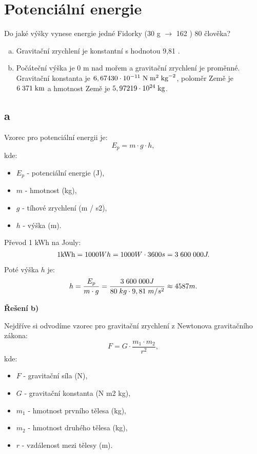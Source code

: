 \documentclass{article}
\begin{document}
\maketitle
\tableofcontents
\newpage



\section{Potenciální energie \spicy}
Do jaké výšky vynese energie jedné Fidorky (30 g $\rightarrow$ 162 \ueqKCAL) 80 \ueqKG \fs člověka?


\begin{enumerate}[a)]
    \item Gravitační zrychlení je konstantní s hodnotou 9,81 \ueqMandSinvsq.
    \item Počáteční výška je 0 m nad mořem a gravitační zrychlení je proměnné. Gravitační konstanta je $6,67430 \cdot 10^{-11} \; \textrm{N} \; \textrm{m}^{\textrm{2}} \; \textrm{kg}^{-2}$, poloměr Země je $6 \; 371 \; \textrm{km}$ a hmotnost Země je $5,97219 \cdot 10^{24} \; \textrm{kg}$.
\end{enumerate}


\subsection{a}

Vzorec pro potenciální energii je:
$$
    E_p = m \cdot g \cdot h,
$$
kde:
\begin{itemize}
    \item $E_p$ - potenciální energie (J),
    \item $m$ - hmotnost (kg),
    \item $g$ - tíhové zrychlení (m / s2),
    \item $h$ - výška (m).
\end{itemize}

Převod 1 kWh na Jouly:
$$
    1 \textrm{kWh} = 1000 Wh = 1000 W \cdot 3600 s = 3 \; 600 \; 000 J.
$$

Poté výška $h$ je:
$$
    h = \frac{E_p}{m \cdot g} = \frac{3 \; 600 \; 000 J}{80 \; kg \cdot 9,81 \; m/s^2} \approx 4 587 m.
$$

\textbf{Řešení b)}

Nejdříve si odvodíme vzorec pro gravitační zrychlení z Newtonova gravitačního zákona:
$$
    F = G \cdot \frac{m_1 \cdot m_2}{r^2},
$$
kde:
\begin{itemize}
    \item $F$ - gravitační síla (N),
    \item $G$ - gravitační konstanta (N \fs m2 \fs kg),
    \item $m_1$ - hmotnost prvního tělesa (kg),
    \item $m_2$ - hmotnost druhého tělesa (kg),
    \item $r$ - vzdálenost mezi tělesy (m).
\end{itemize}
\end{document}
